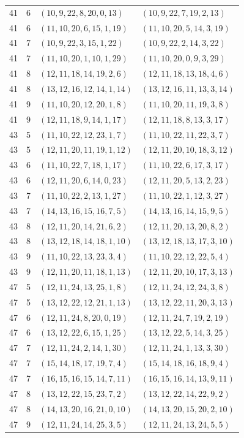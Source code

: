 \documentclass[11pt,a4paper]{article}
\theoremstyle{definition}
\numberwithin{equation}{section}
\begin{document}
\begin{longtable}{rrll}
41&6&$(10,9,22,8,20,0,13)$&$(10,9,22,7,19,2,13)$\\
41&6&$(11,10,20,6,15,1,19)$&$(11,10,20,5,14,3,19)$\\
41&7&$(10,9,22,3,15,1,22)$&$(10,9,22,2,14,3,22)$\\
41&7&$(11,10,20,1,10,1,29)$&$(11,10,20,0,9,3,29)$\\
41&8&$(12,11,18,14,19,2,6)$&$(12,11,18,13,18,4,6)$\\
41&8&$(13,12,16,12,14,1,14)$&$(13,12,16,11,13,3,14)$\\
41&9&$(11,10,20,12,20,1,8)$&$(11,10,20,11,19,3,8)$\\
41&9&$(12,11,18,9,14,1,17)$&$(12,11,18,8,13,3,17)$\\
43&5&$(11,10,22,12,23,1,7)$&$(11,10,22,11,22,3,7)$\\
43&5&$(12,11,20,11,19,1,12)$&$(12,11,20,10,18,3,12)$\\
43&6&$(11,10,22,7,18,1,17)$&$(11,10,22,6,17,3,17)$\\
43&6&$(12,11,20,6,14,0,23)$&$(12,11,20,5,13,2,23)$\\
43&7&$(11,10,22,2,13,1,27)$&$(11,10,22,1,12,3,27)$\\
43&7&$(14,13,16,15,16,7,5)$&$(14,13,16,14,15,9,5)$\\
43&8&$(12,11,20,14,21,6,2)$&$(12,11,20,13,20,8,2)$\\
43&8&$(13,12,18,14,18,1,10)$&$(13,12,18,13,17,3,10)$\\
43&9&$(11,10,22,13,23,3,4)$&$(11,10,22,12,22,5,4)$\\
43&9&$(12,11,20,11,18,1,13)$&$(12,11,20,10,17,3,13)$\\
47&5&$(12,11,24,13,25,1,8)$&$(12,11,24,12,24,3,8)$\\
47&5&$(13,12,22,12,21,1,13)$&$(13,12,22,11,20,3,13)$\\
47&6&$(12,11,24,8,20,0,19)$&$(12,11,24,7,19,2,19)$\\
47&6&$(13,12,22,6,15,1,25)$&$(13,12,22,5,14,3,25)$\\
47&7&$(12,11,24,2,14,1,30)$&$(12,11,24,1,13,3,30)$\\
47&7&$(15,14,18,17,19,7,4)$&$(15,14,18,16,18,9,4)$\\
47&7&$(16,15,16,15,14,7,11)$&$(16,15,16,14,13,9,11)$\\
47&8&$(13,12,22,15,23,7,2)$&$(13,12,22,14,22,9,2)$\\
47&8&$(14,13,20,16,21,0,10)$&$(14,13,20,15,20,2,10)$\\
47&9&$(12,11,24,14,25,3,5)$&$(12,11,24,13,24,5,5)$\\

\end{longtable}
\end{document}
